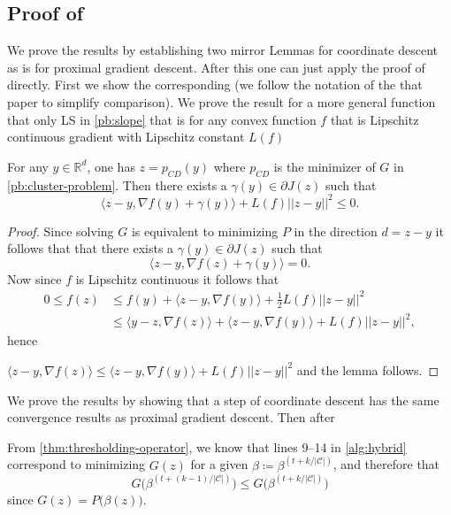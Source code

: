\subsection{Proof of }
We prove the results by establishing two mirror Lemmas for coordinate descent as \textcite[Lemmas 2.2,2.3]{beck2009} is for proximal gradient descent. After this one can just apply the proof of \textcite[Theorem 3.1]{beck2009} directly.
First we show the corresponding \textcite[Lemmas 2.1]{beck2009} (we follow the notation of the that paper to simplify comparison). We prove the result for a more general function that only LS in \eqref{pb:slope} that is for any convex function $f$ that is Lipschitz continuous gradient with Lipschitz constant $L(f)$ 
\begin{lemma}
For any ${y} \in \mathbb{R}^d$, one has ${z}=p_{CD}(y)$ where $p_{CD}$ is the minimizer of  $G$ in \eqref{pb:cluster-problem}. Then there exists a $\gamma({y}) \in \partial J({z})$ such that
$$
\langle {z}- {y},\nabla f({y}) + \gamma(y) \rangle + L(f) ||  {z}-{y}||^2  \leq 0.
$$
\end{lemma}
\begin{proof}
Since solving $G$ is equivalent to minimizing $P$ in the direction ${d} = {z}- {y}$ it follows that that there exists a $\gamma({y}) \in \partial J({z})$ such that
$$
\langle {z}- {y},\nabla f({z}) + \gamma(y) \rangle  = 0.
$$
Now since $f$ is Lipschitz continuous it follows that 
\begin{align*}
0 \leq f(z)  &\leq f(y) +   \langle z-y,\nabla f({y})  \rangle + \frac12 L(f) ||  {z}-{y}||^2  \\
 & \leq   \langle y-z,\nabla f({z})  \rangle + \langle z-y,\nabla f({y})  \rangle + L(f) ||  {z}-{y}||^2,
\end{align*}
hence 

$
\langle {z}- {y},\nabla f({z}) \rangle \leq \langle {z}- {y},\nabla f({y}) \rangle + L(f) ||  {z}-{y}||^2  $ and the lemma follows.
\end{proof}

We prove the results by showing that a step of coordinate descent has the same convergence results as proximal gradient descent. Then after  

From \cref{thm:thresholding-operator}, we know that lines 9--14 in \cref{alg:hybrid} correspond to minimizing \(G(z)\) for a given \(\beta \coloneqq \beta^{(t + k / |\mathcal{C}|)}\), and therefore that
\[
  G\big(\beta^{(t + (k - 1) / |\mathcal{C}|)}\big) \leq G\big(\beta^{(t + k / |\mathcal{C}|)}\big)
\]
since \(G(z) = P\big(\beta(z)\big)\).

